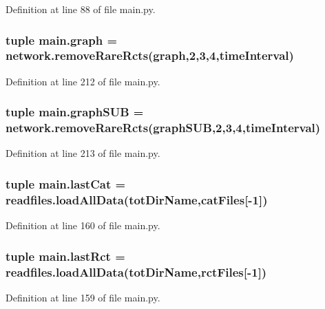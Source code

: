 Definition at line 88 of file main.\+py.

\hypertarget{a00153_a4cfdc01ecc5ad260a4f30c9353e3d856}{
\subsubsection[{graph}]{\setlength{\rightskip}{0pt plus 5cm}tuple main.\+graph = network.\+remove\+Rare\+Rcts(graph,2,3,4,{\bf time\+Interval})}}\label{a00153_a4cfdc01ecc5ad260a4f30c9353e3d856}


Definition at line 212 of file main.\+py.

\hypertarget{a00153_ab96de87bc8cbe59221256af996bdc43e}{
\subsubsection[{graph\+S\+U\+B}]{\setlength{\rightskip}{0pt plus 5cm}tuple main.\+graph\+S\+U\+B = network.\+remove\+Rare\+Rcts(graph\+S\+U\+B,2,3,4,{\bf time\+Interval})}}\label{a00153_ab96de87bc8cbe59221256af996bdc43e}


Definition at line 213 of file main.\+py.

\hypertarget{a00153_a1d69cc4251d83bb227555044baf27b86}{
\subsubsection[{last\+Cat}]{\setlength{\rightskip}{0pt plus 5cm}tuple main.\+last\+Cat = readfiles.\+load\+All\+Data({\bf tot\+Dir\+Name},{\bf cat\+Files}\mbox{[}-\/1\mbox{]})}}\label{a00153_a1d69cc4251d83bb227555044baf27b86}


Definition at line 160 of file main.\+py.

\hypertarget{a00153_ad9cee9fada504bb0dab86df3a416232b}{
\subsubsection[{last\+Rct}]{\setlength{\rightskip}{0pt plus 5cm}tuple main.\+last\+Rct = readfiles.\+load\+All\+Data({\bf tot\+Dir\+Name},{\bf rct\+Files}\mbox{[}-\/1\mbox{]})}}\label{a00153_ad9cee9fada504bb0dab86df3a416232b}


Definition at line 159 of file main.\+py.

